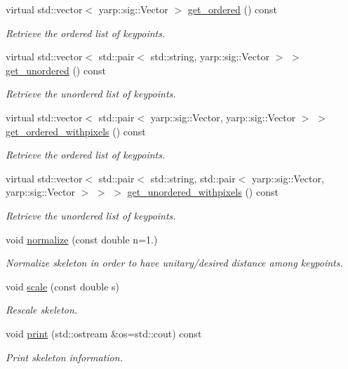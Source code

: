 \begin{DoxyCompactItemize}
virtual std\+::vector$<$ yarp\+::sig\+::\+Vector $>$ \mbox{\hyperlink{classassistive__rehab_1_1Skeleton_a9c56f7f9e243ae2c4c3fef6dbb051dc2}{get\+\_\+ordered}} () const
\begin{DoxyCompactList}\small\item\em Retrieve the ordered list of keypoints. \end{DoxyCompactList}\item 
virtual std\+::vector$<$ std\+::pair$<$ std\+::string, yarp\+::sig\+::\+Vector $>$ $>$ \mbox{\hyperlink{classassistive__rehab_1_1Skeleton_a7b9f01b2b0f5450920335347c5861a2f}{get\+\_\+unordered}} () const
\begin{DoxyCompactList}\small\item\em Retrieve the unordered list of keypoints. \end{DoxyCompactList}\item 
virtual std\+::vector$<$ std\+::pair$<$ yarp\+::sig\+::\+Vector, yarp\+::sig\+::\+Vector $>$ $>$ \mbox{\hyperlink{classassistive__rehab_1_1Skeleton_a270506cde494cb4261c7892edb46ce53}{get\+\_\+ordered\+\_\+withpixels}} () const
\begin{DoxyCompactList}\small\item\em Retrieve the ordered list of keypoints. \end{DoxyCompactList}\item 
virtual std\+::vector$<$ std\+::pair$<$ std\+::string, std\+::pair$<$ yarp\+::sig\+::\+Vector, yarp\+::sig\+::\+Vector $>$ $>$ $>$ \mbox{\hyperlink{classassistive__rehab_1_1Skeleton_a513a3dc56d55a7b10b256378ae63c6c7}{get\+\_\+unordered\+\_\+withpixels}} () const
\begin{DoxyCompactList}\small\item\em Retrieve the unordered list of keypoints. \end{DoxyCompactList}\item 
void \mbox{\hyperlink{classassistive__rehab_1_1Skeleton_a7753cc8d2b43e27eaf7bf9ef640a99cb}{normalize}} (const double n=1.)
\begin{DoxyCompactList}\small\item\em Normalize skeleton in order to have unitary/desired distance among keypoints. \end{DoxyCompactList}\item 
void \mbox{\hyperlink{classassistive__rehab_1_1Skeleton_a21fded128e2240e4dd507030b7386670}{scale}} (const double s)
\begin{DoxyCompactList}\small\item\em Rescale skeleton. \end{DoxyCompactList}\item 
\mbox{\label{classassistive__rehab_1_1Skeleton_a58289ea0ba49220afac3e8d7128493b4}} 
void \mbox{\hyperlink{classassistive__rehab_1_1Skeleton_a58289ea0ba49220afac3e8d7128493b4}{print}} (std\+::ostream \&os=std\+::cout) const
\begin{DoxyCompactList}\small\item\em Print skeleton information. \end{DoxyCompactList}\end{DoxyCompactItemize}
